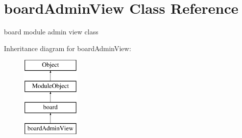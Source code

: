 \hypertarget{classboardAdminView}{\section{board\-Admin\-View Class Reference}
\label{classboardAdminView}
}


board module admin view class  


Inheritance diagram for board\-Admin\-View\-:\begin{figure}[H]
\begin{center}
\leavevmode
\includegraphics[height=4.000000cm]{classboardAdminView}
\end{center}
\end{figure}

